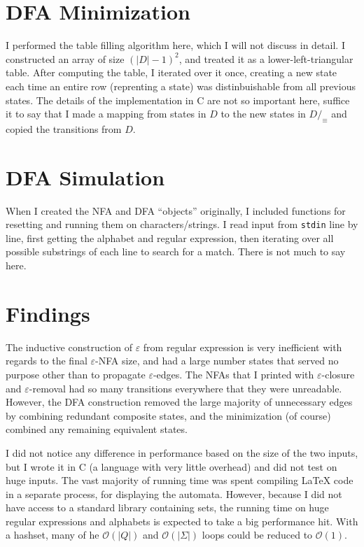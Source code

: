 \documentclass{article}
\begin{document}
\section*{DFA Minimization}
I performed the table filling algorithm here, which I will not discuss in detail. I constructed an array of size $(|D|-1)^2$, and treated it as a lower-left-triangular table. After computing the table, I iterated over it once, creating a new state each time an entire row (reprenting a state) was distinbuishable from all previous states. The details of the implementation in C are not so important here, suffice it to say that I made a mapping from states in $D$ to the new states in $D/_\equiv$ and copied the transitions from $D$.

\section*{DFA Simulation}
When I created the NFA and DFA ``objects'' originally, I included functions for resetting and running them on characters/strings. I read input from \texttt{stdin} line by line, first getting the alphabet and regular expression, then iterating over all possible substrings of each line to search for a match. There is not much to say here.

\section*{Findings}
The inductive construction of $\varepsilon$ from regular expression is very inefficient with regards to the final $\varepsilon$-NFA size, and had a large number states that served no purpose other than to propagate $\varepsilon$-edges. The NFAs that I printed with $\varepsilon$-closure and $\varepsilon$-removal had so many transitions everywhere that they were unreadable. However, the DFA construction removed the large majority of unnecessary edges by combining redundant composite states, and the minimization (of course) combined any remaining equivalent states.

I did not notice any difference in performance based on the size of the two inputs, but I wrote it in C (a language with very little overhead) and did not test on huge inputs. The vast majority of running time was spent compiling \LaTeX{} code in a separate process, for displaying the automata. However, because I did not have access to a standard library containing sets, the running time on huge regular expressions and alphabets is expected to take a big performance hit. With a hashset, many of he $\mathcal{O}(|Q|)$ and $\mathcal{O}(|\Sigma|)$ loops could be reduced to $\mathcal{O}(1)$.
\end{document}
